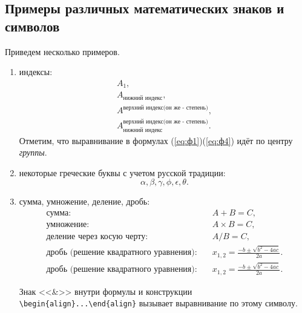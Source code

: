 \newpage
\subsection{Примеры различных математических знаков и символов}

Приведем несколько примеров.

\begin{enumerate}
\item индексы:
{\zerodisplayskips
	\begin{align}
	A_1, \label{eq:ф1}\\
	A_{\text{нижний индекс}}, \label{eq:ф2}\\
	A^{\text{верхний индекс(он же - степень)}}, \label{eq:ф3}\\
	A_{\text{нижний индекс}}^{\text{верхний индекс(он же - степень)}}. \label{eq:ф4}
	\end{align}	
}%
Отметим, что выравнивание в формулах (\ref{eq:ф1})\ndash (\ref{eq:ф4}) идёт по центру \textit{группы}.
\item некоторые греческие буквы с учетом русской традиции:	
{\zerodisplayskips
	\begin{equation}
	\alpha,\beta,\gamma,\phi,\epsilon,\theta. \label{eq:ф5}
	\end{equation}
}%
\item сумма, умножение, деление, дробь:
{\zerodisplayskips
	\begin{align}
	\text{сумма:}\quad & A+B=C, \label{eq:ф6}\\
	\text{умножение:}\quad & A\times B=C, \label{eq:ф7}\\
	\text{деление через косую черту:}\quad & A/B=C, \label{eq:ф8}\\
	\text{дробь (решение квадратного уравнения):}\quad & x_{1,2}=\frac{-b\pm\sqrt{b^2-4ac}}{2a}. \label{eq:ф9}\\
	\text{дробь (решение квадратного уравнения):}\quad & x_{1,2}=\frac{-b\pm\sqrt{b^2-4ac}}{2a}. \label{eq:ф99}
	\end{align}
}%

Знак <<\&>> внутри формулы и конструкции \verb=\begin{align}...\end{align}= вызывает выравнивание по этому символу. 


\end{enumerate}
